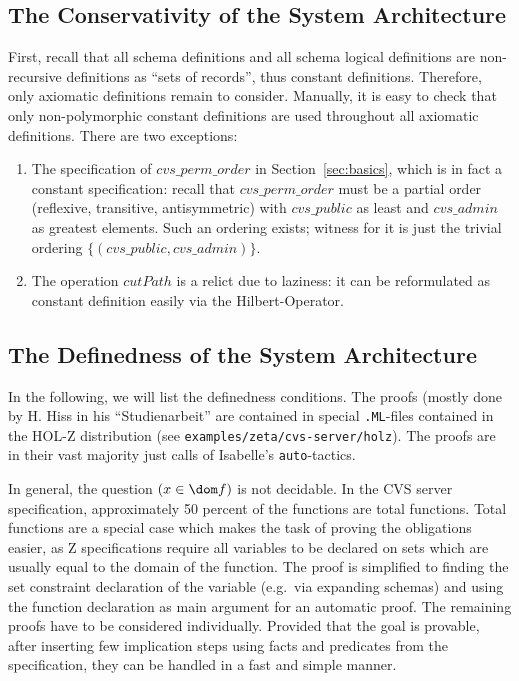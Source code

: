 \subsection{The Conservativity of the System Architecture}
First, recall that all schema definitions and all schema logical definitions are
non-recursive definitions as ``sets of records'', thus constant
definitions. Therefore, only axiomatic definitions remain to consider.
Manually, it is easy to check that only non-polymorphic constant definitions are
used throughout all axiomatic definitions. There are two exceptions:
\begin{enumerate}
\item The specification of $cvs\_perm\_order$ in Section~\ref{sec:basics},
      which is in fact a constant specification: recall that 
      $cvs\_perm\_order$ must be a partial order (reflexive, transitive,
      antisymmetric) with $cvs\_public$ as least and $cvs\_admin$ as greatest
      elements. Such an ordering exists; witness for it is just the trivial
      ordering $\{(cvs\_public,cvs\_admin)\}$.
\item The operation $cutPath$ is a relict due to laziness: it can be
  reformulated as constant definition easily via the Hilbert-Operator.
\end{enumerate}

\subsection{The Definedness of the System Architecture}
In the following, we will list the definedness conditions.
The proofs (mostly done by H. Hiss in his ``Studienarbeit'' are contained
in special \verb+.ML+-files contained in the HOL-Z distribution (see
\verb+examples/zeta/cvs-server/holz+). The proofs are in their vast majority
just calls of Isabelle's \verb+auto+-tactics.
%
%

In general, the question $(x \in \dom f)$ is not decidable. In the CVS server
specification, approximately 50 percent of the functions are total functions.
Total functions are a special case which makes the task of proving the
obligations easier, as Z specifications require all variables to be declared on
sets which are usually equal to the domain of the function. The proof is
simplified to finding the set constraint declaration of the variable (e.g.\ via
expanding schemas) and using the function declaration as main argument for an
automatic proof. The remaining proofs have to be considered individually.
Provided that the goal is provable, after inserting few implication steps using
facts and predicates from the specification, they can be handled in a fast and
simple manner.

